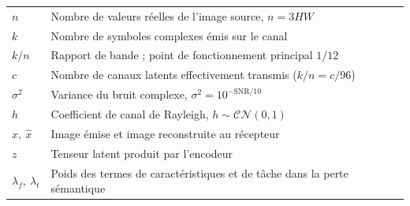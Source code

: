 \begin{small}
\begin{tabular}{@{}p{2.2cm}p{12.6cm}@{}}
\toprule
$n$ & Nombre de valeurs réelles de l'image source, $n = 3HW$ \\
$k$ & Nombre de symboles complexes émis sur le canal \\
$k/n$ & Rapport de bande ; point de fonctionnement principal $1/12$ \\
$c$ & Nombre de canaux latents effectivement transmis ($k/n = c/96$) \\
$\sigma^2$ & Variance du bruit complexe, $\sigma^2 = 10^{-\mathrm{SNR}/10}$ \\
$h$ & Coefficient de canal de Rayleigh, $h \sim \mathcal{CN}(0,1)$ \\
$x,\ \hat{x}$ & Image émise et image reconstruite au récepteur \\
$z$ & Tenseur latent produit par l'encodeur \\
$\lambda_f,\ \lambda_t$ & Poids des termes de caractéristiques et de tâche dans la perte sémantique \\
\bottomrule
\end{tabular}
\end{small}
